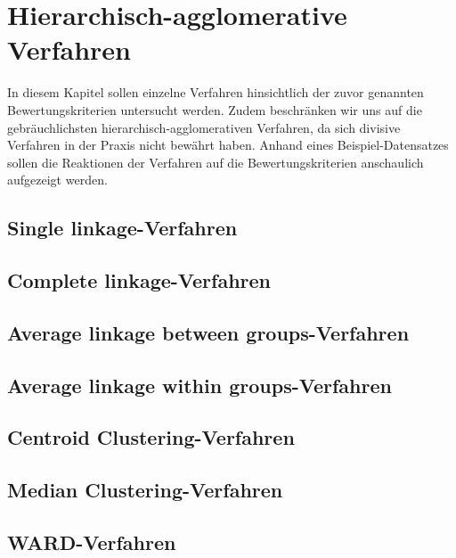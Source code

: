 \chapter{Hierarchisch-agglomerative Verfahren}

In diesem Kapitel sollen einzelne Verfahren hinsichtlich der zuvor genannten Bewertungskriterien untersucht werden. Zudem beschränken wir uns auf die gebräuchlichsten hierarchisch-agglomerativen Verfahren, da sich divisive Verfahren in der Praxis nicht bewährt haben. Anhand eines Beispiel-Datensatzes sollen die Reaktionen der Verfahren auf die Bewertungskriterien anschaulich aufgezeigt werden.

\section{Single linkage-Verfahren}
\section{Complete linkage-Verfahren}
\section{Average linkage between groups-Verfahren}
\section{Average linkage within groups-Verfahren}
\section{Centroid Clustering-Verfahren}
\section{Median Clustering-Verfahren}
\section{WARD-Verfahren}